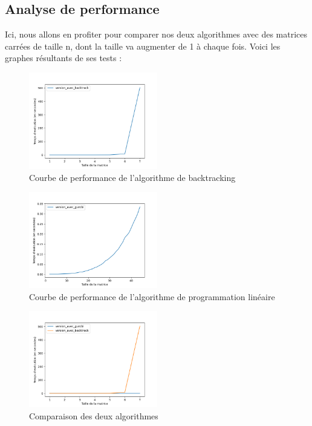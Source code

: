 \documentclass[french,a4paper]{article}
\begin{document}
\subsection{Analyse de performance}
Ici, nous allons en profiter pour comparer nos deux algorithmes avec des matrices carrées de taille n, dont la taille va augmenter de 1 à chaque fois. Voici les graphes résultants de ses tests :
\begin{figure}[H]
    \centering
    \includegraphics[width=0.5\textwidth]{img/backtrack.png}
    \caption{Courbe de performance de l'algorithme de backtracking}\label{fig:figure}
\end{figure}
\begin{figure}[H]
    \centering
    \includegraphics[width=0.5\textwidth]{img/gurobi.png}
    \caption{Courbe de performance de l'algorithme de programmation linéaire}\label{fig:figure2}
\end{figure}
\begin{figure}[H]
    \centering
    \includegraphics[width=0.5\textwidth]{img/comparaison_algo.png}
    \caption{Comparaison des deux algorithmes}\label{fig:figure3}
\end{figure}
\end{document}
